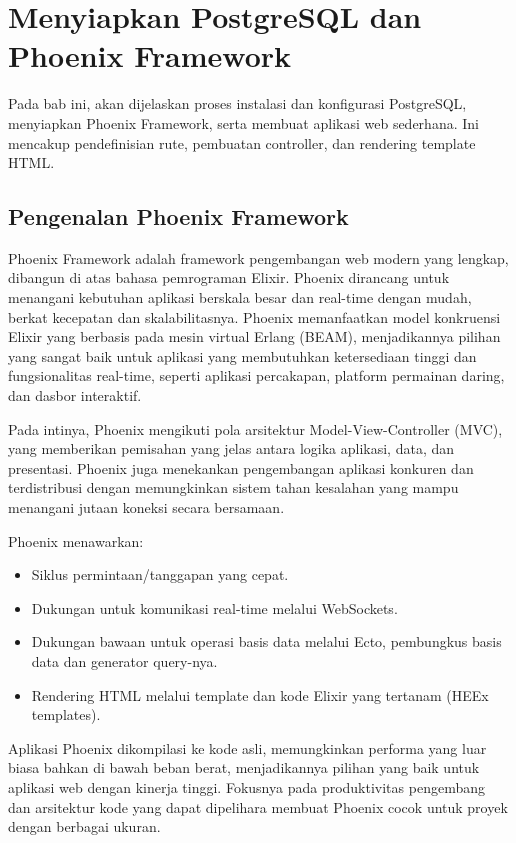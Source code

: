 \chapter{Menyiapkan PostgreSQL dan Phoenix Framework}

Pada bab ini, akan dijelaskan proses instalasi dan konfigurasi PostgreSQL, menyiapkan Phoenix Framework, serta membuat aplikasi web sederhana. Ini mencakup pendefinisian rute, pembuatan controller, dan rendering template HTML.

\section{Pengenalan Phoenix Framework}
Phoenix Framework adalah framework pengembangan web modern yang lengkap, dibangun di atas bahasa pemrograman Elixir. Phoenix dirancang untuk menangani kebutuhan aplikasi berskala besar dan real-time dengan mudah, berkat kecepatan dan skalabilitasnya. Phoenix memanfaatkan model konkruensi Elixir yang berbasis pada mesin virtual Erlang (BEAM), menjadikannya pilihan yang sangat baik untuk aplikasi yang membutuhkan ketersediaan tinggi dan fungsionalitas real-time, seperti aplikasi percakapan, platform permainan daring, dan dasbor interaktif.

Pada intinya, Phoenix mengikuti pola arsitektur Model-View-Controller (MVC), yang memberikan pemisahan yang jelas antara logika aplikasi, data, dan presentasi. Phoenix juga menekankan pengembangan aplikasi konkuren dan terdistribusi dengan memungkinkan sistem tahan kesalahan yang mampu menangani jutaan koneksi secara bersamaan.

Phoenix menawarkan:
\begin{itemize}
	\item Siklus permintaan/tanggapan yang cepat.
	\item Dukungan untuk komunikasi real-time melalui WebSockets.
	\item Dukungan bawaan untuk operasi basis data melalui Ecto, pembungkus basis data dan generator query-nya.
	\item Rendering HTML melalui template dan kode Elixir yang tertanam (HEEx templates).
\end{itemize}

Aplikasi Phoenix dikompilasi ke kode asli, memungkinkan performa yang luar biasa bahkan di bawah beban berat, menjadikannya pilihan yang baik untuk aplikasi web dengan kinerja tinggi. Fokusnya pada produktivitas pengembang dan arsitektur kode yang dapat dipelihara membuat Phoenix cocok untuk proyek dengan berbagai ukuran.


